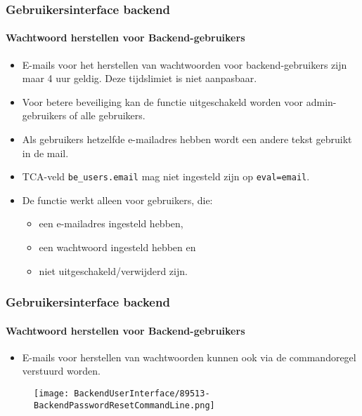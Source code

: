 
\begin{frame}[fragile]
	\frametitle{Gebruikersinterface backend}
	\framesubtitle{Wachtwoord herstellen voor Backend-gebruikers}

	\begin{itemize}

		\item E-mails voor het herstellen van wachtwoorden voor backend-gebruikers zijn maar 4 uur geldig.\newline
		Deze tijdslimiet is niet aanpasbaar.
		\item Voor betere beveiliging kan de functie uitgeschakeld worden voor admin-gebruikers of alle gebruikers.
		\item Als gebruikers hetzelfde e-mailadres hebben wordt een andere tekst gebruikt in de mail.
		\item TCA-veld \texttt{be\_users.email} mag niet ingesteld zijn op \texttt{eval=email}.

		\item De functie werkt alleen voor gebruikers, die:
			\begin{itemize}
				\item een e-mailadres ingesteld hebben,
				\item een wachtwoord ingesteld hebben en
				\item niet uitgeschakeld/verwijderd zijn.
			\end{itemize}

	\end{itemize}

\end{frame}


\begin{frame}[fragile]
	\frametitle{Gebruikersinterface backend}
	\framesubtitle{Wachtwoord herstellen voor Backend-gebruikers}

	\begin{itemize}
		\item E-mails voor herstellen van wachtwoorden kunnen ook via de commandoregel verstuurd worden.
	\end{itemize}

	\begin{figure}
		\texttt{[image: BackendUserInterface/89513-BackendPasswordResetCommandLine.png]}
	\end{figure}

\end{frame}

